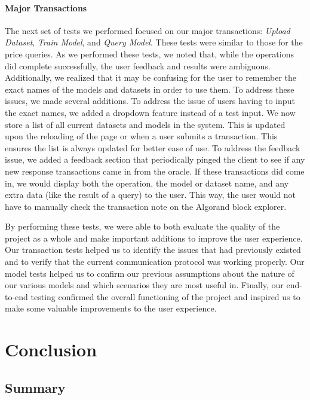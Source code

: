 \documentclass{article}
\begin{document}
    \paragraph{Major Transactions}
    The next set of tests we performed focused on our major transactions: \textit{Upload Dataset}, \textit{Train Model},
    and \textit{Query Model}.  These tests were similar to those for the price queries.  As we performed these tests, we
    noted that, while the operations did complete successfully, the user feedback and results were ambiguous.  Additionally,
    we realized that it may be confusing for the user to remember the exact names of the models and datasets in order to
    use them.  To address these issues, we made several additions.  To address the issue of users having to input the
    exact names, we added a dropdown feature instead of a test input.  We now store a list of all current datasets and
    models in the system.  This is updated upon the reloading of the page or when a user submits a transaction.  This
    ensures the list is always updated for better ease of use.  To address the feedback issue, we added a feedback section
    that periodically pinged the client to see if any new response transactions came in from the oracle.  If these
    transactions did come in, we would display both the operation, the model or dataset name, and any extra data (like
    the result of a query) to the user.  This way, the user would not have to manually check the transaction note on
    the Algorand block explorer.

    By performing these tests, we were able to both evaluate the quality of the project as a whole and make important
    additions to improve the user experience.  Our transaction tests helped us to identify the issues that had
    previously existed and to verify that the current communication protocol was working properly.  Our model tests
    helped us to confirm our previous assumptions about the nature of our various models and which scenarios they are
    most useful in.  Finally, our end-to-end testing confirmed the overall functioning of the project and inspired us
    to make some valuable improvements to the user experience.

    \section{Conclusion}

    \subsection{Summary}
\end{document}
